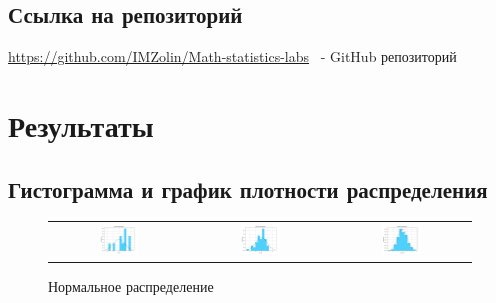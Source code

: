 \documentclass[a4paper,14pt]{article}
\begin{document}
		\subsection{Ссылка на репозиторий}
		\url{https://github.com/IMZolin/Math-statistics-labs} \ - GitHub репозиторий
	
	\section{Результаты}
	\subsection{Гистограмма и график плотности распределения}
	\begin{figure}[H]
		\centering
		\begin{tabular}{c c c}
			\includegraphics[height = 0.25\textheight, width = 0.31\textwidth]{../image/lab1/lab1_norm_10.png}
			& \includegraphics[height = 0.25\textheight, width = 0.31\textwidth]{../image/lab1/lab1_norm_50.png}
			& \includegraphics[height = 0.25\textheight, width = 0.31\textwidth]{../image/lab1/lab1_norm_1000.png}
		\end{tabular}
		\caption{Нормальное распределение}
	\end{figure}
	
\end{document}
